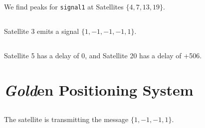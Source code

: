 \documentclass[]{article}
\begin{document}
\subsection{}

We find peaks for \texttt{signal1} at Satellites \(\{4, 7, 13, 19\}\). 

\subsection{}

Satellite 3 emits a signal \(\{1, -1, -1, -1, 1\}\). 

\subsection{}

Satellite 5 has a delay of 0, and Satellite 20 has a delay of +506. 

\section{\textit{Gold}en Positioning System}

\subsection{}

The satellite is transmitting the message \(\{1, -1, -1, 1\}\). 

\subsection{}
\end{document}
